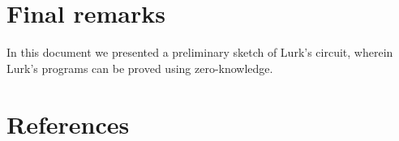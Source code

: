 \documentclass[10pt, english]{article}
\begin{document}
\section{Final remarks}

In this document we presented a preliminary sketch of Lurk's circuit, wherein Lurk's programs can be proved using zero-knowledge.

\section{References}




\end{document}
